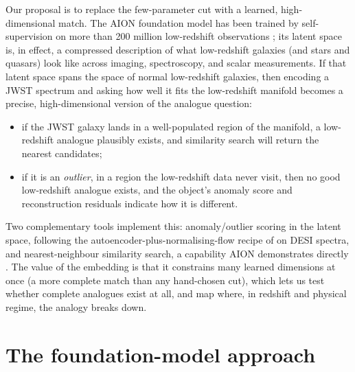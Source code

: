 \documentclass[onecolumn,astrosymb,tighten,longbib,trackchanges]{aastex7} %
\newcommand{\aion}{\textsc{AION}\xspace}
\begin{document}
Our proposal is to replace the few-parameter cut with a learned, high-dimensional match. The \aion
foundation model has been trained by self-supervision on more than 200 million low-redshift
observations \citep{Parker2025_AION_omnimodal}; its latent space is, in effect, a compressed
description of what low-redshift galaxies (and stars and quasars) look like across imaging,
spectroscopy, and scalar measurements. If that latent space spans the space of normal low-redshift
galaxies, then encoding a JWST spectrum and asking how well it fits the low-redshift manifold
becomes a precise, high-dimensional version of the analogue question:
\begin{itemize}
  \item if the JWST galaxy lands in a well-populated region of the manifold, a low-redshift
        analogue plausibly exists, and similarity search will return the nearest candidates;
  \item if it is an \emph{outlier}, in a region the low-redshift data never visit, then no good
        low-redshift analogue exists, and the object's anomaly score and reconstruction residuals
        indicate how it is different.
\end{itemize}
Two complementary tools implement this: anomaly/outlier scoring in the latent space, following the
autoencoder-plus-normalising-flow recipe of \citet{Liang2023_outlier_detection} on DESI spectra, and
nearest-neighbour similarity search, a capability \aion demonstrates directly
\citep{Parker2025_AION_omnimodal}. The value of the embedding is that it constrains many learned
dimensions at once (a more complete match than any hand-chosen cut), which lets us test whether
complete analogues exist at all, and map where, in redshift and physical regime, the analogy breaks
down.


\section{The foundation-model approach} \label{sec:approach}
\end{document}
